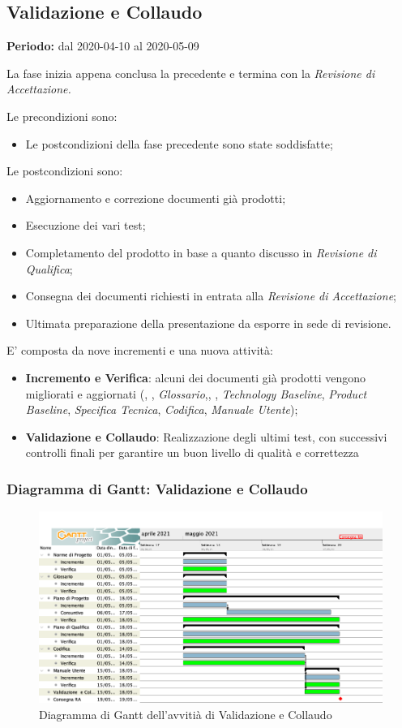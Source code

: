 \subsection{Validazione e Collaudo}
\label{validazione_e_collaudo}
\textbf{Periodo:} dal 2020-04-10 al 2020-05-09

La fase inizia appena conclusa la precedente e termina con la \textit{Revisione di Accettazione.}

Le precondizioni sono:
\begin{itemize}
    \item Le postcondizioni della fase precedente sono state soddisfatte;
\end{itemize}

Le postcondizioni sono:
\begin{itemize}
    \item Aggiornamento e correzione documenti già prodotti;
    \item Esecuzione dei vari test;
    \item Completamento del prodotto in base a quanto discusso in \textit{Revisione di Qualifica};
    \item Consegna dei documenti richiesti in entrata alla \textit{Revisione di Accettazione};
    \item Ultimata preparazione della presentazione da esporre in sede di revisione.
\end{itemize}

E' composta da nove incrementi e una nuova attività:
\begin{itemize}
    \item \textbf{Incremento e Verifica}: alcuni dei documenti già prodotti vengono migliorati e aggiornati (\textit{\NdP}, \textit{\PdP}, \textit{Glossario},\textit{\PdQ}, \textit{\AdR}, \textit{Technology Baseline}, \textit{Product Baseline}, \textit{Specifica Tecnica}, \textit{Codifica}, \textit{Manuale Utente}); 
    \item \textbf{Validazione e Collaudo}: Realizzazione degli ultimi test, con successivi controlli finali per garantire un buon livello di qualità e correttezza
\end{itemize}

\newpage
\subsubsection{Diagramma di Gantt: Validazione e Collaudo}
\begin{figure}[ht]
    \centering
    \includegraphics[width=\textwidth]{../../Immagini/GanttValidazioneECollaudo}
    \caption{Diagramma di Gantt dell'avvitià di Validazione e Collaudo}
\end{figure}